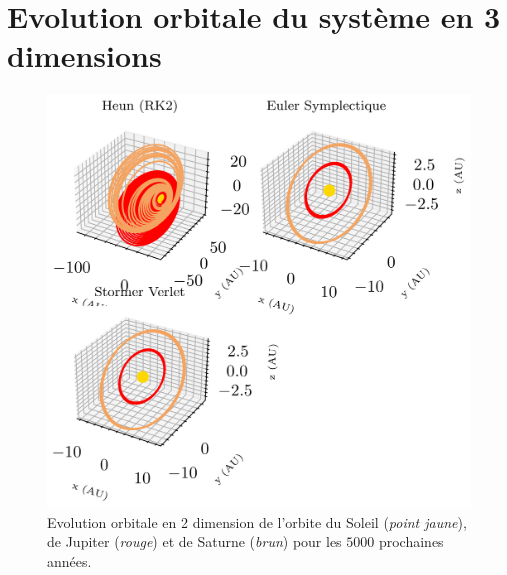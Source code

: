 \documentclass[11pt,twoside=semi,openright,numbers=noenddot]{article}
\begin{document}
\section{Evolution orbitale du système en 3 dimensions}
\begin{figure}[H]
  \centering
  \includegraphics{figures/5000_years/orbital-plot3d.png}
  \caption{Evolution orbitale en 2 dimension de l'orbite du Soleil (\emph{point jaune}), de Jupiter (\emph{rouge}) et de Saturne (\emph{brun}) pour les $5000$ prochaines années.}
  \label{fig:orbital-plot3D--5000}
\end{figure}
\end{document}
